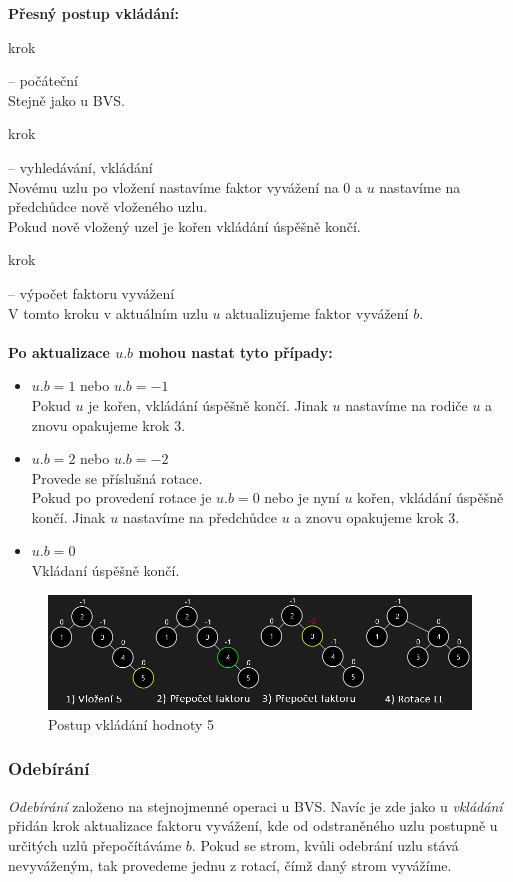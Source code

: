 \documentclass[
  biblatex=false,
  font=serif,
  glossaries=false,
  tables=false,
  theorems=false,
  index
]{kidiplom}
\begin{document}
\newpage
\noindent \textbf{Přesný postup vkládání:}
\begin{enumerate} {\bfseries
\item  krok} -- počáteční \\
Stejně jako u BVS.
{\bfseries\item  krok} -- vyhledávání, vkládání \\
Novému uzlu po vložení nastavíme faktor vyvážení na 0 a $u$ nastavíme na předchůdce nově vloženého uzlu.\\
Pokud nově vložený uzel je kořen vkládání úspěšně končí.
{\bfseries\item  krok} -- výpočet faktoru vyvážení \\
V tomto kroku v aktuálním uzlu $u$ aktualizujeme faktor vyvážení $b$.\\\\
\textbf{Po aktualizace $u.b$ mohou nastat tyto případy:}
\begin{itemize}
\item $u.b = 1$ nebo $u.b = -1$\\
Pokud $u$ je kořen, vkládání úspěšně končí. Jinak $u$ nastavíme na rodiče $u$ a znovu opakujeme krok 3.
\item $u.b = 2$ nebo $u.b = -2$\\
Provede se příslušná rotace.\\
Pokud po provedení rotace je $u.b = 0$ nebo je nyní $u$ kořen, vkládání úspěšně končí. Jinak $u$ nastavíme na předchůdce $u$ a znovu opakujeme krok 3.
\item $u.b = 0$\\
Vkládaní úspěšně končí.
\end{itemize}
\end{enumerate}

\begin{figure}[h!]
\centering
	\includegraphics[scale=0.55]{obrazky/15AVLVlozeni.png}
	\caption{Postup vkládání hodnoty 5}
\end{figure}

\subsubsection{Odebírání}
\indent\indent \textit{Odebírání} založeno na stejnojmenné operaci u BVS. Navíc je zde jako u \textit{vkládání} přidán krok aktualizace faktoru vyvážení, kde od odstraněného uzlu postupně u určitých uzlů přepočítáváme $b$. Pokud se strom, kvůli odebrání uzlu stává nevyváženým, tak provedeme jednu z rotací, čímž daný strom vyvážíme. 
\end{document}

